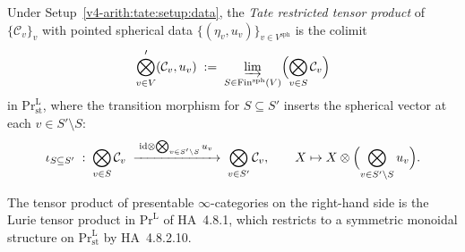 \begin{definition}
\label{v4-arith:tate:def:restricted-tensor}
Under Setup~\ref{v4-arith:tate:setup:data}, the \emph{Tate restricted
tensor product} of \(\{\mathcal{C}_{v}\}_{v}\) with pointed spherical
data \(\{(\eta_{v},u_{v})\}_{v\in V^{\mathrm{sph}}}\) is the colimit
\begin{equation}
\label{v4-arith:tate:eq:restricted-def}
\bigotimes_{v\in V}^{\prime}(\mathcal{C}_{v},u_{v})
\;:=\;
\varinjlim_{S\in\mathrm{Fin}^{\mathrm{sph}}(V)}
\Bigl(\bigotimes_{v\in S}\mathcal{C}_{v}\Bigr)
\end{equation}
in \(\mathrm{Pr}^{\mathrm{L}}_{\mathrm{st}}\), where the transition
morphism for \(S\subseteq S'\) inserts the spherical vector at each
\(v\in S'\setminus S\):
\begin{equation}
\label{v4-arith:tate:eq:unital-extension}
\iota_{S\subseteq S'}\;:\;
\bigotimes_{v\in S}\mathcal{C}_{v}
\;\xrightarrow{\;\mathrm{id}\otimes\bigotimes_{v\in S'\setminus S} u_{v}\;}\;
\bigotimes_{v\in S'}\mathcal{C}_{v},
\qquad
X\mapsto X\otimes\Bigl(\bigotimes_{v\in S'\setminus S}u_{v}\Bigr).
\end{equation}
\end{definition}

The tensor product of presentable \(\infty\)-categories on the
right-hand side is the Lurie tensor product in
\(\mathrm{Pr}^{\mathrm{L}}\) of HA~4.8.1, which restricts to a
symmetric monoidal structure on \(\mathrm{Pr}^{\mathrm{L}}_{\mathrm{st}}\)
by HA~4.8.2.10.

